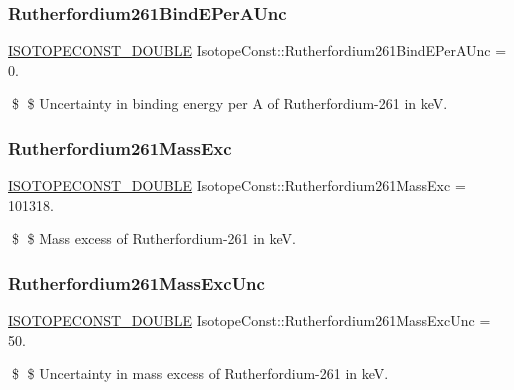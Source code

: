 \subsubsection{\texorpdfstring{Rutherfordium261\+Bind\+E\+Per\+A\+Unc}{Rutherfordium261BindEPerAUnc}}
{\footnotesize\ttfamily \mbox{\hyperlink{group___isotope_const-_macros_ga8f45a7272ce02c0b4c65c44636ed719a}{I\+S\+O\+T\+O\+P\+E\+C\+O\+N\+S\+T\+\_\+\+D\+O\+U\+B\+LE}} Isotope\+Const\+::\+Rutherfordium261\+Bind\+E\+Per\+A\+Unc = 0.}

\$ \$ Uncertainty in binding energy per A of Rutherfordium-\/261 in keV. \mbox{\label{group___isotope_const-_rutherfordium-_rf261_ga63b12d635c762f21fd519d77634782bc}} 
\subsubsection{\texorpdfstring{Rutherfordium261\+Mass\+Exc}{Rutherfordium261MassExc}}
{\footnotesize\ttfamily \mbox{\hyperlink{group___isotope_const-_macros_ga8f45a7272ce02c0b4c65c44636ed719a}{I\+S\+O\+T\+O\+P\+E\+C\+O\+N\+S\+T\+\_\+\+D\+O\+U\+B\+LE}} Isotope\+Const\+::\+Rutherfordium261\+Mass\+Exc = 101318.}

\$ \$ Mass excess of Rutherfordium-\/261 in keV. \mbox{\label{group___isotope_const-_rutherfordium-_rf261_ga66c71c08e01a257877944339cc8c88d1}} 
\subsubsection{\texorpdfstring{Rutherfordium261\+Mass\+Exc\+Unc}{Rutherfordium261MassExcUnc}}
{\footnotesize\ttfamily \mbox{\hyperlink{group___isotope_const-_macros_ga8f45a7272ce02c0b4c65c44636ed719a}{I\+S\+O\+T\+O\+P\+E\+C\+O\+N\+S\+T\+\_\+\+D\+O\+U\+B\+LE}} Isotope\+Const\+::\+Rutherfordium261\+Mass\+Exc\+Unc = 50.}

\$ \$ Uncertainty in mass excess of Rutherfordium-\/261 in keV. \mbox{\label{group___isotope_const-_rutherfordium-_rf261_ga61a3bb94da9281c56d6286d21b8d25bf}} 
